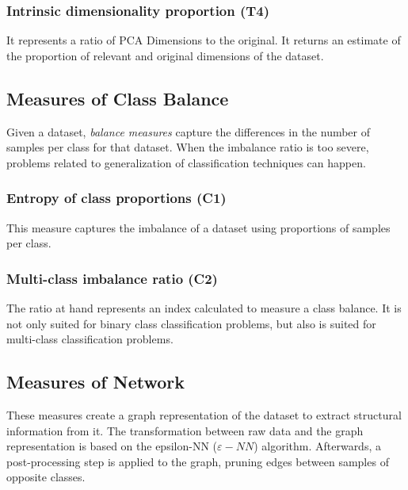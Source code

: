 \subsubsection{Intrinsic dimensionality proportion (T4)}

It represents a ratio of PCA Dimensions to the original. It returns an estimate 
of the proportion of relevant and original dimensions of the dataset.

\subsection{Measures of Class Balance}\label{sec:balance}

Given a dataset, \textit{balance measures} capture the differences in the number 
of samples per class for that dataset. When the imbalance ratio is 
too severe, problems related to generalization of classification techniques 
can happen.

\subsubsection{Entropy of class proportions (C1)}

This measure captures the imbalance of a dataset using proportions of 
samples per class.

\subsubsection{Multi-class imbalance ratio (C2)}

The ratio at hand represents an index calculated to measure a class balance.
It is not only suited for binary class classification problems, but also is  
suited for multi-class classification problems.

\subsection{Measures of Network}\label{sec:network}

These measures create a graph representation of the dataset to extract 
structural information from it. The transformation between raw data and the
graph representation is based on the epsilon-NN ($\varepsilon-NN$) algorithm. 
Afterwards, a post-processing step is applied to the graph, pruning edges 
between samples of opposite classes.

